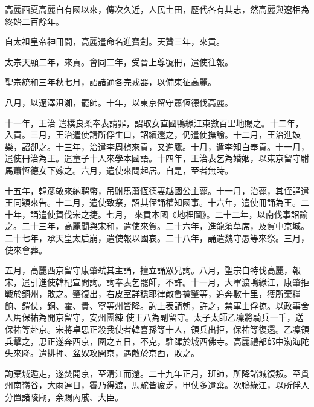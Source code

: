 
\begin{pinyinscope}

 高麗西夏高麗自有國以來，傳次久近，人民土田，歷代各有其志，然高麗與遼相為終始二百餘年。



 自太祖皇帝神冊間，高麗遣命名進寶劍。天贊三年，來貢。



 太宗天顯二年，來貢。會同二年，受晉上尊號冊，遣使往報。



 聖宗統和三年秋七月，詔諸通各完戎器，以備東征高麗。



 八月，以遼澤沮洳，罷師。十年，以東京留守蕭恆德伐高麗。



 十一年，王治
 遣樸良柔奉表請罪，詔取女直國鴨綠江東數百里地賜之。十二年，入貢。三月，王治遣使請所俘生口，詔續還之，仍遣使撫諭。十二月，王治進妓樂，詔卻之。十三年，治遣李周楨來貢，又進鷹。十月，遣李知白奉貢。十一月，遣使冊治為王。遣童子十人來學本國語。十四年，王治表乞為婚姻，以東京留守駙馬蕭恆德女下嫁之。六月，遣使來問起居。自是，至者無時。



 十五年，韓彥敬來納聘幣，吊駙馬蕭恆德妻越國公主薨。十一月，治薨，其侄誦遣王同穎來告。十二月，遣使致祭，詔其侄誦權知國事。十六年，遣使冊誦為王。二十年，誦遣使賀伐宋之捷。七月，
 來貢本國《地裡圖》。二十二年，以南伐事詔諭之。二十三年，高麗聞與宋和，遣使來賀。二十六年，進龍須草席，及賀中京城。二十七年，承天皇太后崩，遣使報以國哀。二十八年，誦遣魏守愚等來祭。三月，使來會葬。



 五月，高麗西京留守康肇弒其主誦，擅立誦眾兄詢。八月，聖宗自特伐高麗，報宋，遣引進使韓杞宣問詢。詢奉表乞罷師，不許。十一月，大軍渡鴨綠江，康肇拒戰於銅州，敗之。肇復出，右皮室詳穩耶律敵魯擒肇等，追奔數十里，獲所棄糧餉、鎧仗，銅、霍、貴、寧等州皆降。詢上表請朝，許之，禁軍士俘掠。以政事舍人馬保祐為開京留守，安州團練
 使王八為副留守。太子太師乙凜將騎兵一千，送保祐等赴京。宋將卓思正殺我使者韓喜孫等十人，領兵出拒，保祐等復還。乙凜領兵擊之，思正遂奔西京，圍之五日，不克，駐蹕於城西佛寺。高麗禮部郎中渤海陀失來降。遣排押、盆奴攻開京，遇敵於京西，敗之。



 詢棄城遁走，遂焚開京，至清江而還。二十九年正月，班師，所降諸城復叛。至貫州南嶺谷，大雨連日，霽乃得渡，馬駝皆疲乏，甲仗多遺棄。次鴨綠江，以所俘人分置諸陵廟，余賜內戚、大臣。




\end{pinyinscope}
